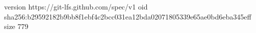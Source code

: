 version https://git-lfs.github.com/spec/v1
oid sha256:b29592182b9bb8f1ebf4c2bcc031ea12bda02071805339e65ae0bd6eba345eff
size 779
